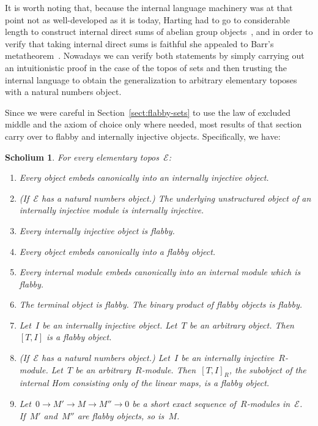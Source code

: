 \documentclass[oneside]{amsart}
\theoremstyle{definition}
\theoremstyle{plain}
\newtheorem{scholium}[defn]{Scholium}
\theoremstyle{remark}
\newcommand{\E}{\mathcal{E}}
\renewcommand{\_}{\mathpunct{.}\,}
\begin{document}
It is worth noting that, because the internal language machinery was at that
point not as well-developed as it is today, Harting had to go to considerable
length to construct internal direct sums of abelian group
objects~\cite{harting:coproduct}, and in order to verify that taking internal
direct sums is faithful she appealed to Barr's
metatheorem~\cite[Theorem~1.7]{harting:effacements}. Nowadays we can verify
both statements by simply carrying out an intuitionistic proof in the case of
the topos of sets and then trusting the internal language to obtain the
generalization to arbitrary elementary toposes with a natural numbers object.

Since we were careful in Section~\ref{sect:flabby-sets} to use the law of
excluded middle and the axiom of choice only where needed, most results of that
section carry over to flabby and internally injective objects. Specifically, we
have:

\begin{scholium}\label{scholium:properties-of-flabby-objects}
For every elementary topos~$\E$:
\begin{enumerate}
\item Every object embeds canonically into an internally injective object.
\item (If~$\E$ has a natural numbers object.) The underlying unstructured
object of an internally injective module is internally injective.
\item Every internally injective object is flabby.
\item Every object embeds canonically into a flabby object.
\item Every internal module embeds canonically into an internal module which is flabby.
\item The terminal object is flabby. The binary product of flabby objects is flabby.
\item Let~$I$ be an internally injective object. Let~$T$ be an arbitrary
object. Then~$[T,I]$ is a flabby object.
\item (If~$\E$ has a natural numbers object.) Let~$I$ be an internally
injective~$R$-module. Let~$T$ be an arbitrary~$R$-module. Then~$[T,I]_R$, the
subobject of the internal Hom consisting only of the linear maps, is a flabby
object.
\item Let~$0 \to M' \to M \to M'' \to 0$ be a short exact sequence
of~$R$-modules in~$\E$. If~$M'$ and~$M''$ are flabby objects, so is~$M$.
\end{enumerate}
\end{scholium}
\end{document}
